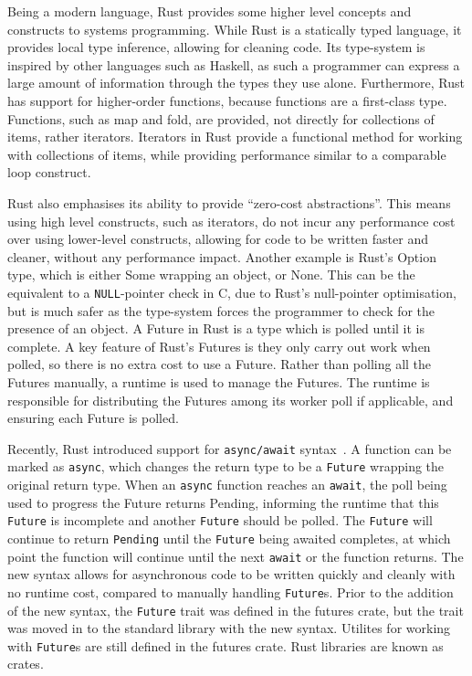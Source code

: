 Being a modern language, Rust provides some higher level concepts and constructs to systems programming.
While Rust is a statically typed language, it provides local type inference, allowing for cleaning code.
Its type-system is inspired by other languages such as Haskell, as such a programmer can express a large amount of
information through the types they use alone.
Furthermore, Rust has support for higher-order functions, because functions are a first-class type.
Functions, such as map and fold, are provided, not directly for collections of items, rather iterators.
Iterators in Rust provide a functional method for working with collections of items, while providing performance similar
to a comparable loop construct.

Rust also emphasises its ability to provide “zero-cost abstractions”.
This means using high level constructs, such as iterators, do not incur any performance cost over using lower-level
constructs, allowing for code to be written faster and cleaner, without any performance impact.
Another example is Rust's Option type, which is either Some wrapping an object, or None.
This can be the equivalent to a \texttt{NULL}-pointer check in C, due to Rust's null-pointer optimisation, but is much
safer as the type-system forces the programmer to check for the presence of an object.
A Future in Rust is a type which is polled until it is complete.
A key feature of Rust's Futures is they only carry out work when polled, so there is no extra cost to use a Future.
Rather than polling all the Futures manually, a runtime is used to manage the Futures.
The runtime is responsible for distributing the Futures among its worker poll if applicable, and ensuring each Future is
polled.

Recently, Rust introduced support for \texttt{async/await} syntax~\citep{withoutboats_asyncawaitnotation_}.
A function can be marked as \texttt{async}, which changes the return type to be a \texttt{Future} wrapping the original
return type.
When an \texttt{async} function reaches an \texttt{await}, the poll being used to progress the Future returns Pending,
informing the runtime that this \texttt{Future} is incomplete and another \texttt{Future} should be polled.
The \texttt{Future} will continue to return \texttt{Pending} until the \texttt{Future} being awaited completes,
at which point the function will continue until the next \texttt{await} or the function returns.
The new syntax allows for asynchronous code to be written quickly and cleanly with no runtime cost, compared to
manually handling \texttt{Future}s.
Prior to the addition of the new \asyncawait{} syntax, the \texttt{Future} trait was defined in the futures crate, but
the trait was moved in to the standard library with the new syntax.
Utilites for working with \texttt{Future}s are still defined in the futures crate.
Rust libraries are known as crates.

